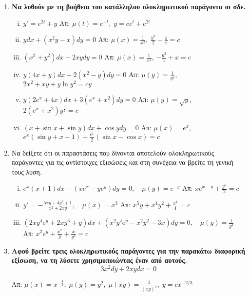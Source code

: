 \begin{enumerate}
  \item {\bfseries Να λυθούν με τη βοήθεια του κατάλληλου ολοκληρωτικού 
    παράγοντα οι σδε.}
    \begin{enumerate}[i)]
      \item $ y' = e^{2t}+y $ \hfill Απ: $ \mu (t) = e^{-t}, \; y=ce^{t}+e^{2t} $ 
      \item $ ydx+(x^{2}y-x)dy=0 $ \hfill Απ: $ \mu (x) = \frac{1}{x^{2}}, \;
        \frac{y^{2}}{2} - \frac{y}{x} = c $ 
      \item $ (x^{2}+y^{2})dx - 2xydy = 0 $ 
        \hfill Απ: $\mu(x)= \frac{1}{x^{2}}$, $ - \frac{y^{2}}{x} + x = c $
      \item $ y(4x+y)dx-2(x^{2}-y)dy=0 $ 
        \hfill Απ: $ \mu(y)= \frac{1}{y^{2}} $, $ 2x^{2}+xy+ y \ln{y^{2}} =cy$ 
      \item $ y(2e^{x}+4x)dx + 3(e^{x}+x^{2})dy = 0 $ 
        \hfill Απ: $ \mu(y)= \sqrt{ y } $, $ 2(e^{x}+x^{2})y^{\frac{3}{2}}=c $ 
      \item $ (x + \sin{x} + \sin{y})dx + \cos{y} dy =0 $ 
        \hfill Απ: $\mu(x)=e^{x} $, $ e^x(\sin{y} + x-1) + \frac{e^{x}}{2} 
        (\sin{x} - \cos{x})=c $
    \end{enumerate}

  \item Να δείξετε ότι οι παραστάσεις που δίνονται αποτελούν ολοκληρωτικούς παράγοντες 
    για τις αντίστοιχες εξισώσεις και στη συνέχεια να βρείτε τη γενική τους λύση.
    \begin{enumerate}[i)]
      \item $ e^{x}(x+1)dx - (xe^{x}-ye^{y})dy = 0, \quad  \mu(y) = e^{-y} $
        \hfill Απ: $xe^{x-y} + \frac{y^{2}}{2} = c $
      \item $ y' =- \frac{5xy+4y^{2}+1}{x^{2}+2xy}, \quad \mu(x)=x^{3} $  
        \hfill Απ: $ x^{5}y+x^{4}y^{2} + \frac{x^{4}}{4} = c $ 
      \item $ (2xy^{4} \mathrm{e}^{y} + 2xy^{3}+y)dx + (x^{2}y^{4}\mathrm{e}^{y} -
        x^{2}y^{2}-3x)dy=0, \quad \mu (y) = \frac{1}{y^{4}} $ 
        \hfill Απ: $ x^{2}e^{y}+ \frac{x^{2}}{y} + \frac{x}{y^{3}} =c $ 
    \end{enumerate}

  \item {\bfseries Αφού βρείτε τρεις ολοκληρωτικούς παράγοντες για την 
    παρακάτω διαφορική εξίσωση, να τη λύσετε χρησιμοποιώντας έναν από αυτούς.}
    \[
      3x^{2}dy+2xydx=0 
    \] 

    \hfill Απ:  $ \mu (x) = x^{-\frac{4}{3}}, \; \mu (y) = y^{2}, \; \mu (xy) =
    \frac{1}{(xy)^{4}}, \; y=cx^{-2/3} $


\end{enumerate}
